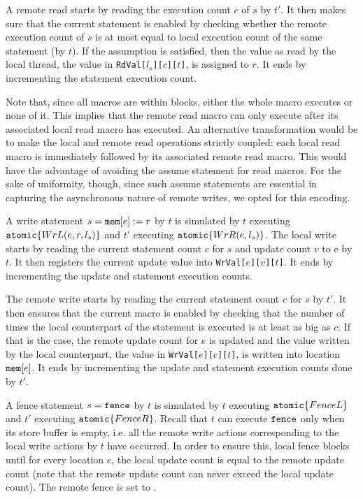 A remote read starts by reading the execution count $c$ of $s$ by $t'$.
It then makes sure that the current statement is enabled by checking whether the remote execution count of $s$ is at most equal to local execution count of the same statement (by $t$).
If the assumption is satisfied, then the value as read by the local thread, the value in {\tt RdVal[$l_s$][$c$][$t$]}, is assigned to $r$.
It ends by incrementing the statement execution count.

Note that, since all macros are within {\aliatomic} blocks, either the whole macro executes or none of it. 
This implies that the remote read macro can only execute after its associated local read macro has executed.
An alternative transformation would be to make the local and remote read operations strictly coupled: each local read macro is immediately followed by its associated remote read macro.
This would have the advantage of avoiding the assume statement for read macros.
For the sake of uniformity, though, since such assume statements are essential in capturing the asynchronous nature of remote writes, we opted for this encoding.

A write statement $s=\mathtt{mem}[e]:=r$ by $t$ is simulated by $t$ executing $\mathtt{atomic}\{WrL(e,r,l_s)\}$ and $t'$ executing $\mathtt{atomic}\{WrR(e,l_s)\}$.
The local write starts by reading the current statement count $c$ for $s$ and update count $v$ to {\alimemx e} by $t$.
It then registers the current update value into {\tt WrVal[$e$][$v$][$t$]}.
It ends by incrementing the update and statement execution counts.

The remote write starts by reading the current statement count $c$ for $s$ by $t'$.
It then ensures that the current macro is enabled by checking that the number of times the local counterpart of the statement is executed is at least as big as $c$.
If that is the case, the remote update count for $e$ is updated and the value written by the local counterpart, the value in {\tt WrVal[$e$][$c$][$t$]}, is written into location $\mathtt{mem}[e]$.
It ends by incrementing the update and statement execution counts done by $t'$.

A fence statement $s=\mathtt{fence}$ by $t$ is simulated by $t$ executing $\mathtt{atomic}\{FenceL\}$ and $t'$ executing $\mathtt{atomic}\{FenceR\}$.
Recall that $t$ can execute $\mathtt{fence}$ only when its store buffer is empty, i.e. all the remote write actions corresponding to the local write actions by $t$ have occurred.
In order to ensure this, local fence blocks until for every location $e$, the local update count is equal to the remote update count (note that the remote update count can never exceed the local update count). 
The remote fence is set to \aliskip.

